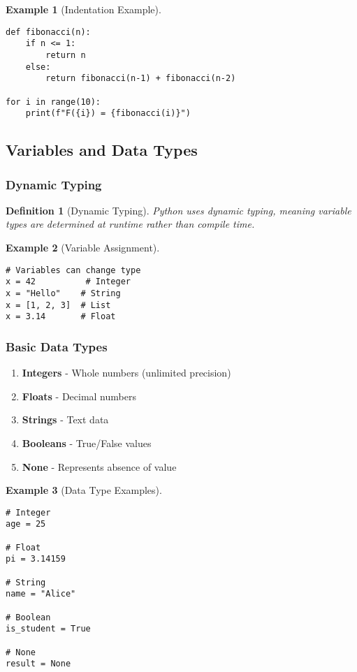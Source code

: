 \documentclass[11pt]{article}
\newtheorem{definition}{Definition}[section]
\newtheorem{example}{Example}[section]
\begin{document}
\begin{example}[Indentation Example]
\begin{lstlisting}
def fibonacci(n):
    if n <= 1:
        return n
    else:
        return fibonacci(n-1) + fibonacci(n-2)

for i in range(10):
    print(f"F({i}) = {fibonacci(i)}")
\end{lstlisting}
\end{example}

\subsection{Variables and Data Types}

\subsubsection{Dynamic Typing}

\begin{definition}[Dynamic Typing]
Python uses dynamic typing, meaning variable types are determined at runtime rather than compile time.
\end{definition}

\begin{example}[Variable Assignment]
\begin{lstlisting}
# Variables can change type
x = 42          # Integer
x = "Hello"    # String
x = [1, 2, 3]  # List
x = 3.14       # Float
\end{lstlisting}
\end{example}

\subsubsection{Basic Data Types}

\begin{enumerate}
    \item \textbf{Integers} - Whole numbers (unlimited precision)
    \item \textbf{Floats} - Decimal numbers
    \item \textbf{Strings} - Text data
    \item \textbf{Booleans} - True/False values
    \item \textbf{None} - Represents absence of value
\end{enumerate}

\begin{example}[Data Type Examples]
\begin{lstlisting}
# Integer
age = 25

# Float
pi = 3.14159

# String
name = "Alice"

# Boolean
is_student = True

# None
result = None
\end{lstlisting}
\end{example}
\end{document}
